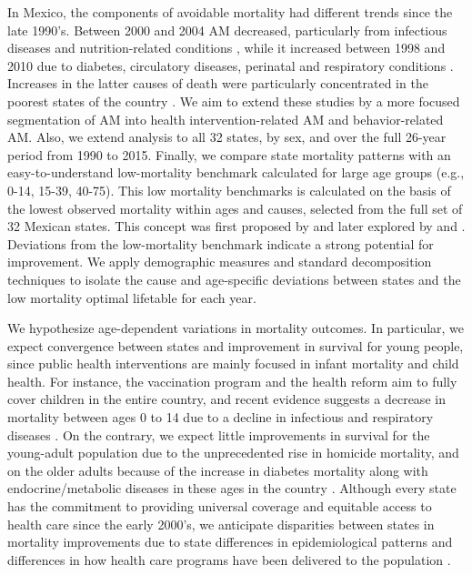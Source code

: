 \documentclass[11.5pt]{article}
\begin{document}
\begin{spacing}{1.5}
 In Mexico, the components of avoidable mortality had different trends since the
late 1990's. Between 2000 and 2004 AM decreased, particularly from
infectious diseases and nutrition-related conditions \citep{francomarina2006}, while it increased between 1998 and 2010 due to diabetes, circulatory diseases, perinatal and respiratory conditions
\citep{agudelo2014efecto}. Increases in the latter causes
of death were particularly concentrated in the poorest states of the country
\citep{davila2014mortalidad}. We aim to extend these studies
by a more focused segmentation of AM into health intervention-related AM and
behavior-related AM. Also, we extend analysis to all 32 states, by sex, and over
the full 26-year period from 1990 to 2015. Finally, we compare state mortality patterns
with an easy-to-understand low-mortality benchmark calculated for large age groups (e.g., 0-14, 15-39, 40-75). This low mortality
benchmarks is calculated on the basis of the lowest observed mortality within
ages and causes, selected from the full set of 32 Mexican states. This concept was first
proposed by \citet{whelpton1947} and later explored by  \citet{wunsch1975minimum} and
\citet{vallin2008minimum}. Deviations from the low-mortality benchmark indicate a strong potential for improvement. We apply demographic measures and
standard decomposition techniques to isolate the cause and age-specific deviations between states and the low mortality optimal lifetable for each year.

We hypothesize age-dependent variations in mortality outcomes.
In particular, we expect convergence between states and improvement in survival
for young people, since public health interventions are mainly focused in infant
mortality and child health. For instance, the vaccination program and the health
reform aim to fully cover children in the entire country, and recent
evidence suggests a decrease in mortality between ages 0 to 14 due to a decline
in infectious and respiratory diseases \citep{gonzalez2016mexico}. On the contrary, we
expect little improvements in survival for the  young-adult population due to the unprecedented rise in homicide mortality, and on the older adults because of the increase in diabetes mortality along with endocrine/metabolic diseases in these ages in the country \citep{gonzalez2016mexico}. Although every
state has the commitment to providing universal coverage and equitable access to
health care since the early 2000's, we anticipate disparities between states
in mortality improvements due to state differences in epidemiological patterns and differences in how  health care programs have been delivered to the population
\citep{Frenk2006}.



\end{spacing}
\end{document}
